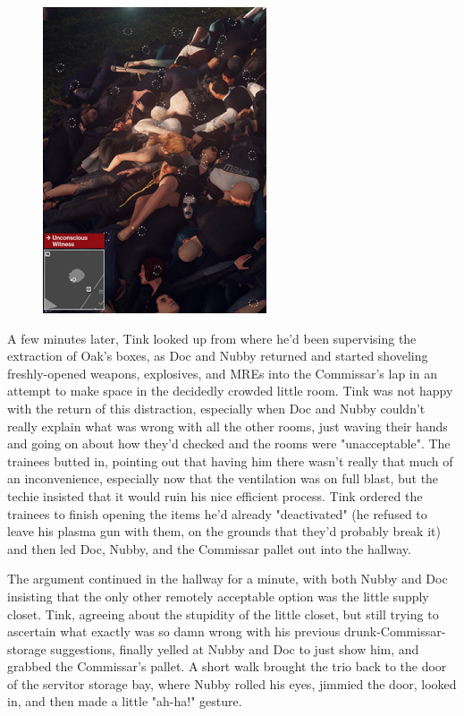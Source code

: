 \begin{figure}
	\begin{center}
		\includegraphics[width=\figwidth]{pics/21/82.png}
	\end{center}
\end{figure}
A few minutes later, Tink looked up from where he'd been supervising the extraction of Oak's boxes, as Doc and Nubby returned and started shoveling freshly-opened weapons, explosives, and MREs into the Commissar's lap in an attempt to make space in the decidedly crowded little room. 
Tink was not happy with the return of this distraction, especially when Doc and Nubby couldn't really explain what was wrong with all the other rooms, just waving their hands and going on about how they'd checked and the rooms were "unacceptable". 
The trainees butted in, pointing out that having him there wasn't really that much of an inconvenience, especially now that the ventilation was on full blast, but the techie insisted that it would ruin his nice efficient process. 
Tink ordered the trainees to finish opening the items he'd already "deactivated" (he refused to leave his plasma gun with them, on the grounds that they'd probably break it) and then led Doc, Nubby, and the Commissar pallet out into the hallway.

The argument continued in the hallway for a minute, with both Nubby and Doc insisting that the only other remotely acceptable option was the little supply closet. 
Tink, agreeing about the stupidity of the little closet, but still trying to ascertain what exactly was so damn wrong with his previous drunk-Commissar-storage suggestions, finally yelled at Nubby and Doc to just show him, and grabbed the Commissar's pallet. 
A short walk brought the trio back to the door of the servitor storage bay, where Nubby rolled his eyes, jimmied the door, looked in, and then made a little "ah-ha!" gesture.

